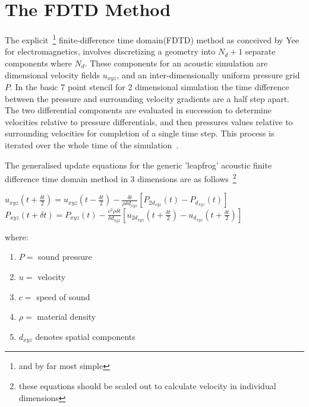 \documentclass{svproc}
\begin{document}
\section{The FDTD Method}

The explicit~\footnote{and by far most simple} finite-difference time domain(FDTD) method as conceived by Yee~\cite{Yee1966} for electromagnetics, involves discretizing a geometry into $N_d+1$ separate components where $N_d$. These components for an acoustic simulation are dimensional velocity fields $\textit{u}_{xyz}$, and an  inter-dimensionally uniform pressure grid $\textit{P}$. In the basic 7 point stencil for 2 dimensional simulation the time difference between the pressure and surrounding velocity gradients are a half step apart. The two differential components are evaluated in succession to determine velocities relative to pressure differentials, and then pressures values relative to surrounding velocities for completion of a single time step. This process is iterated over the whole time of the simulation~\cite{Schneider2015}.


The generalised update equations for the generic 'leapfrog' acoustic finite difference time domain method in 3 dimensions are as follows~\footnote{these equations should be scaled out to calculate velocity in individual dimensions}

\begin{center}
$u_{xyz}(t + \frac{\delta t}{2}) = u_{xyz}(t - \frac{\delta t}{2}) - \frac{ \delta t}{\rho \delta d_{xyz}} [P_{2d_{xyz}}(t) - P_{d_{xyz}}(t)]$\\
$P_{xyz}(t + \delta t) = P_{xyz}(t) - \frac{ c^2 \rho \delta t}{ \delta d_{xyz}} [u_{2d_{xyz}}(t + \frac{\delta t}{2}) - u_{d_{xyz}}(t + \frac{\delta t}{2})]$\\
\end{center}
where:
\begin{enumerate}
\item $P =$ sound pressure
\item $u =$ velocity
\item $c =$ speed of sound
\item $\rho =$  material density
\item $d_{xyz}$ denotes spatial components 
\end{enumerate}
\end{document}
